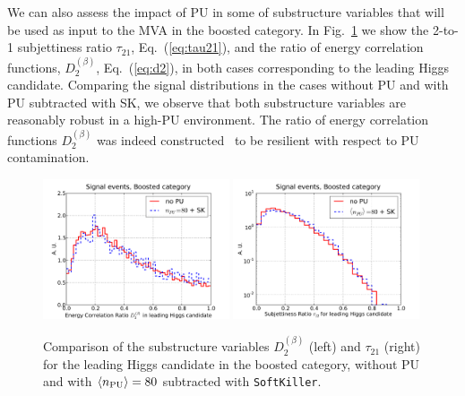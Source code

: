We can also assess the impact of PU in some of
substructure variables that will be 
used as input to the MVA in the boosted category.
%
In Fig.~\ref{fig:Substructure_PU} we show the 2-to-1 subjettiness ratio
$\tau_{21}$, Eq.~(\ref{eq:tau21}), and the ratio
of energy correlation functions, $D_2^{(\beta)}$,
Eq.~(\ref{eq:d2}), in both cases
corresponding to the leading Higgs candidate.
%
Comparing the signal distributions in the cases without PU and
with PU subtracted with SK, we observe that both substructure variables
are reasonably robust in a high-PU environment.
%
The ratio of energy correlation functions $D_2^{(\beta)}$ 
was indeed constructed~\cite{Larkoski:2013eya}
to be resilient
with respect to PU contamination.
%

\begin{figure}[t]
  \begin{center}
  \includegraphics[width=0.49\textwidth]{plots/D2_h0_bst_comp.pdf}
  \includegraphics[width=0.49\textwidth]{plots/tau21_h0_bst_comp.pdf}
   \caption{\small
     Comparison of the substructure variables $D_2^{(\beta)}$ (left)
     and $\tau_{21}$ (right)
     for the leading Higgs candidate in the boosted category,
   without PU and with $\left\langle n_{\rm PU}\right\rangle=80$ subtracted with {\tt SoftKiller}.
}
\label{fig:Substructure_PU}
\end{center}
\end{figure}

